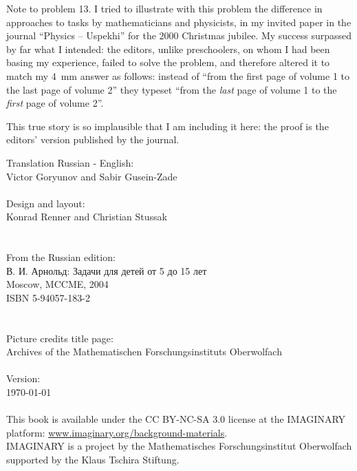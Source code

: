 \vfill
\begin{note}{Note to problem 13.}
	I tried to illustrate with this problem the difference in approaches to tasks by mathematicians and physicists, in my invited paper in the journal \enquote{Physics -- Uspekhi} for the 2000 Christmas jubilee. My success surpassed by far what I intended: the editors, unlike preschoolers, on whom I had been basing my experience, failed to solve the problem, and therefore altered it to match my \SI{4}{\mm} answer as follows: instead of \enquote{from the first page of volume 1 to the last page of volume 2} they typeset \enquote{from the \emph{last} page of volume 1 to the \emph{first} page of volume 2}.

	This true story is so implausible that I am including it here: the proof is the editors' version published by the journal.  
\end{note}
\clearpage
\null\vfill
\noindent
Translation Russian - English:\\
\null\quad Victor Goryunov and Sabir Gusein-Zade\\
\\
Design and layout:\\
\null\quad Konrad Renner and Christian Stussak\\
\\
\\
From the Russian edition:\\
\null\quad \textrussian{В. И. Арнольд: Задачи для детей от 5 до 15 лет}\\
\null\quad Moscow, MCCME, 2004\\
\null\quad ISBN 5-94057-183-2\\
\\
\\
Picture credits title page:\\ 
\null\quad Archives of the Mathematischen Forschungsinstituts Oberwolfach\\
\\
Version:\\
\null\quad \today\\
\\
This book is available under the CC BY-NC-SA 3.0 license at the IMAG\-I\-NARY platform: \href{http://www.imaginary.org/background-materials}{www.imaginary.org/background-materials}.\\
IMAGINARY is a project by the Mathematisches Forschungsinstitut Oberwolfach supported by the Klaus Tschira Stiftung.

